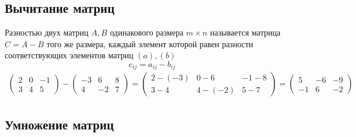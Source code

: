 \documentclass[a4paper, 11pt, oneside]{article}
\begin{document}
\subsection{Вычитание матриц}

Разностью двух матриц $A, B$ одинакового размера $m\times n$ называется матрица $C = A-B$ того же размера, каждый элемент которой равен разности соответствующих элементов матриц $(a), (b)$
$$
	c_{ij} = a_{ij} - b_{ij}
$$
\begin{gather*}
	\begin{pmatrix}
		2& 0& -1\\
		3& 4& 5
	\end{pmatrix}
	-
	\begin{pmatrix}
		-3& 6& 8\\
		4& -2& 7
	\end{pmatrix}
	=
	\begin{pmatrix}
		2-(-3)& 0-6& -1-8\\
		3-4& 4-(-2)& 5-7
	\end{pmatrix}
	=
	\begin{pmatrix}
		5& -6& -9\\
		-1& 6& -2
	\end{pmatrix}
\end{gather*}

\subsection{Умножение матриц}
\end{document}
